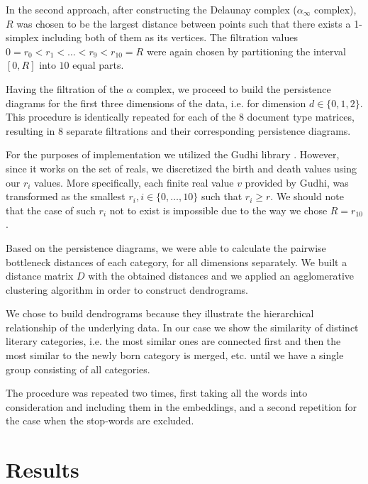\documentclass[fleqn]{article}
\begin{document}
In the second approach, after constructing the Delaunay complex ($\alpha_{\infty}$ complex), $R$ was chosen to be the largest distance between points such that there exists a 1-simplex including both of them as its vertices. The filtration values $0=r_0 < r_1 < \dots < r_9 < r_{10} = R$ were again chosen by partitioning the interval $[0, R]$ into $10$ equal parts.


Having the filtration of the $\alpha$ complex, we proceed to build the persistence diagrams for the first three dimensions of the data, i.e. for dimension $d \in \{0, 1, 2\}$. This procedure is identically repeated for each of the $8$ document type matrices, resulting in $8$ separate filtrations and their corresponding persistence diagrams.

For the purposes of implementation we utilized the Gudhi library \cite{gudhi:urm}. However, since it works on the set of reals, we  discretized the birth and death values using our $r_i$ values. More specifically, each finite real value $v$ provided by Gudhi, was transformed as the smallest $r_i, i \in \{0, \dots, 10\}$ such that $r_i \geq r$. We should note that the case of such $r_i$ not to exist is impossible due to the way we chose $R = r_{10}$.

Based on the persistence diagrams, we were able to calculate the pairwise bottleneck distances of each category, for all dimensions separately. We built a distance matrix $D$ with the obtained distances and we applied an agglomerative clustering algorithm in order to construct dendrograms.

We chose to build dendrograms because they illustrate the hierarchical relationship of the underlying data. In our case we show the similarity of distinct literary categories, i.e. the most similar ones are connected first and then the most similar to the newly born category is merged, etc. until we have a single group consisting of all categories.

The procedure was repeated two times, first taking all the words into consideration and including them in the embeddings, and a second repetition for the case when the stop-words are excluded. 

\section{Results} \label{results}
\end{document}
